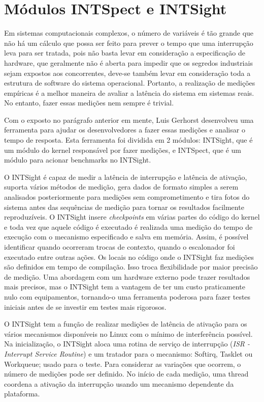 \section{Módulos INTSpect e INTSight}\label{INTSight}

Em sistemas computacionais complexos, o número de variáveis é tão grande que não há um cálculo que possa ser feito para prever o tempo que uma interrupção leva para ser tratada, pois não basta levar em consideração a especificação de hardware, que geralmente não é aberta para impedir que os segredos industriais sejam expostos aos concorrentes, deve-se também levar em consideração toda a estrutura de software do sistema operacional. Portanto, a realização de medições empíricas é a melhor maneira de avaliar a latência do sistema em sistemas reais. No entanto, fazer essas medições nem sempre é trivial.

Com o exposto no parágrafo anterior em mente, Luis Gerhorst \cite{Gerhorst2018} desenvolveu uma ferramenta para ajudar os desenvolvedores a fazer essas medições e analisar o tempo de resposta. Esta ferramenta foi dividida em 2 módulos: INTSight, que é um módulo do kernel responsável por fazer medições, e INTSpect, que é um módulo para acionar benchmarks no INTSight. 

O INTSight é capaz de medir a latência de interrupção e latência de ativação, suporta vários métodos de medição, gera dados de formato simples a serem analisados posteriormente para medições sem comprometimento e tira fotos do sistema antes das sequências de medição para tornar os resultados facilmente reproduzíveis. O INTSight insere \textit{checkpoints} em várias partes do código do kernel e toda vez que aquele código é executado é realizada uma medição do tempo de execução com o mecanismo especificado e salva em memória. Assim, é possível identificar quando ocorreram trocas de contexto, quando o escalonador foi executado entre outras ações. Os locais no código onde o INTSight faz medições são definidos em tempo de compilação. Isso troca flexibilidade por maior precisão de medição. Uma abordagem com um hardware externo pode trazer resultados mais precisos, mas o INTSight tem a vantagem de ter um custo praticamente nulo com equipamentos, tornando-o uma ferramenta poderosa para fazer testes iniciais antes de se investir em testes mais rigorosos.

O INTSight tem a função de realizar medições de latência de ativação para os vários mecanismos disponíveis no Linux com o mínimo de interferência possível. Na inicialização, o INTSight aloca uma rotina de serviço de interrupção (\textit{ISR - Interrupt Service Routine}) e um tratador para o mecanismo: Softirq, Tasklet ou Workqueue; usado para o teste. Para considerar as variações que ocorrem, o número de medições pode ser definido. No início de cada medição, uma thread coordena a ativação da interrupção usando um mecanismo dependente da plataforma.

